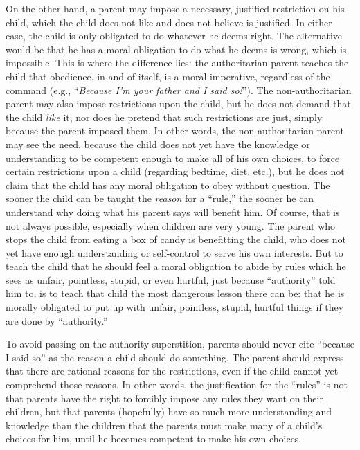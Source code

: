 \documentclass{book}
\begin{document}
On the other hand, a parent may impose a necessary, justified restriction on his child, which the child does not like and does not believe is justified. In either case, the child is only obligated to do whatever he deems right. The alternative would be that he has a moral obligation to do what he deems is wrong, which is impossible. This is where the difference lies: the authoritarian parent teaches the child that obedience, in and of itself, is a moral imperative, regardless of the command (e.g., \enquote{\emph{Because I'm your father and I said so!}}). The non-authoritarian parent may also impose restrictions upon the child, but he does not demand that the child \emph{like} it, nor does he pretend that such restrictions are just, simply because the parent imposed them. In other words, the non-authoritarian parent may see the need, because the child does not yet have the knowledge or understanding to be competent enough to make all of his own choices, to force certain restrictions upon a child (regarding bedtime, diet, etc.), but he does not claim that the child has any moral obligation to obey without question. The sooner the child can be taught the \emph{reason} for a \enquote{rule,} the sooner he can understand why doing what his parent says will benefit him. Of course, that is not always possible, especially when children are very young. The parent who stops the child from eating a box of candy is benefitting the child, who does not yet have enough understanding or self-control to serve his own interests. But to teach the child that he should feel a moral obligation to abide by rules which he sees as unfair, pointless, stupid, or even hurtful, just because \enquote{authority} told him to, is to teach that child the most dangerous lesson there can be: that he is morally obligated to put up with unfair, pointless, stupid, hurtful things if they are done by \enquote{authority.}

To avoid passing on the authority superstition, parents should never cite \enquote{because I said so} as the reason a child should do something. The parent should express that there are rational reasons for the restrictions, even if the child cannot yet comprehend those reasons. In other words, the justification for the \enquote{rules} is not that parents have the right to forcibly impose any rules they want on their children, but that parents (hopefully) have so much more understanding and knowledge than the children that the parents must make many of a child's choices for him, until he becomes competent to make his own choices.
\end{document}
